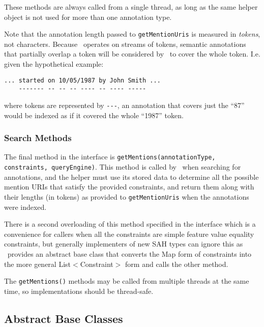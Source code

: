 These methods are always called from a single thread, as long as the same 
helper object is not used for more than one annotation type.

Note that the annotation length passed to {\tt getMentionUris} is measured in
{\em tokens}, not characters.  Because \Mimir\ operates on streams of tokens,
semantic annotations that partially overlap a token will be considered by
\Mimir\ to cover the whole token.  I.e. given the hypothetical example:

\begin{minipage}{\textwidth}
\begin{verbatim}
... started on 10/05/1987 by John Smith ...
    ------- -- -- -- ---- -- ---- -----
\end{verbatim}
\end{minipage}

where tokens are represented by \verb|---|, an annotation that covers just the
``87'' would be indexed as if it covered the whole ``1987'' token.

\subsubsection*{Search Methods}

The final method in the interface is {\tt getMentions(annotationType,
constraints, queryEngine)}.  This method is called by \Mimir\ when searching
for annotations, and the helper must use its stored data to determine all the
possible mention URIs that satisfy the provided constraints, and return them
along with their lengths (in tokens) as provided to {\tt getMentionUris} when
the annotations were indexed.

There is a second overloading of this method specified in the interface which
is a convenience for callers when all the constraints are simple feature value
equality constraints, but generally implementers of new SAH types can ignore
this as \Mimir\ provides an abstract base class that converts the Map form of
constraints into the more general List$<$Constraint$>$ form and calls the other
method.

The {\tt getMentions()} methods may be called from multiple threads at the same
time, so implementations should be thread-safe.

\subsection{Abstract Base Classes}

